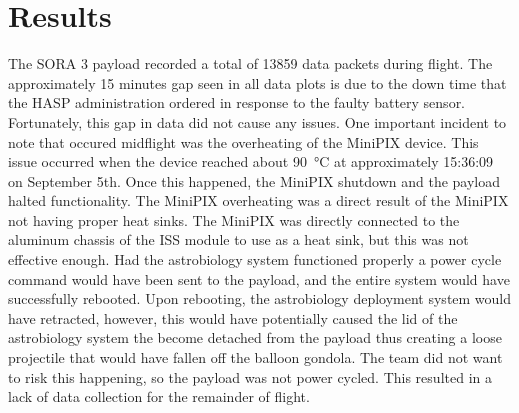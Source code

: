 \section{Results}
\label{sec:Results}

The SORA 3 payload recorded a total of 13859 data packets during flight.
The approximately 15 minutes gap seen in all data plots is due to the down time that the HASP administration ordered in response to the faulty battery sensor.
Fortunately, this gap in data did not cause any issues.
One important incident to note that occured midflight was the overheating of the MiniPIX device.
This issue occurred when the device reached about \SI{90}{\celsius} at approximately 15:36:09 on September 5th.
Once this happened, the MiniPIX shutdown and the payload halted functionality.
The MiniPIX overheating was a direct result of the MiniPIX not having proper heat sinks.
The MiniPIX was directly connected to the aluminum chassis of the ISS module to use as a heat sink, but this was not effective enough.
Had the astrobiology system functioned properly a power cycle command would have been sent to the payload, and the entire system would have successfully rebooted.
Upon rebooting, the astrobiology deployment system would have retracted, however, this would have potentially caused the lid of the astrobiology system the become detached from the payload thus creating a loose projectile that would have fallen off the balloon gondola.
The team did not want to risk this happening, so the payload was not power cycled.
This resulted in a lack of data collection for the remainder of flight.
